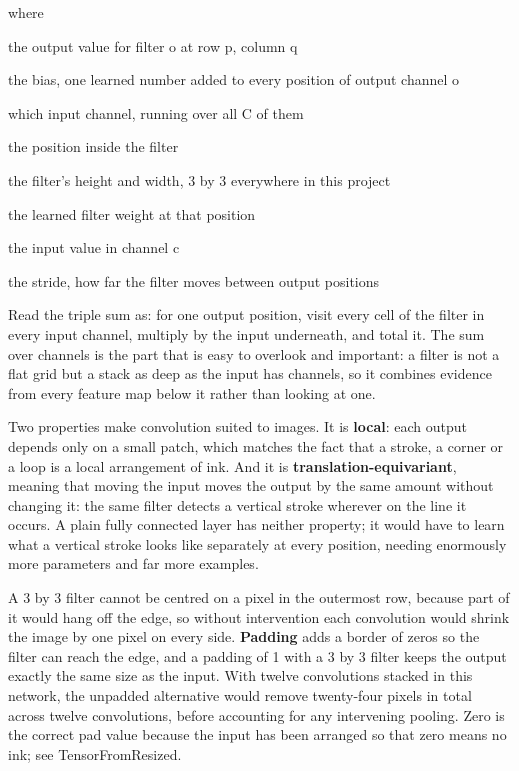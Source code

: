 \noindent where
\begin{description}[leftmargin=2.4em,style=nextline,font=\normalfont\ttfamily]\setlength\itemsep{1pt}
  \item[{$y[o,p,q]$}] \normalfont the output value for filter o at row p, column q
  \item[{$b[o]$}] \normalfont the bias, one learned number added to every position of output channel o
  \item[{$c$}] \normalfont which input channel, running over all C of them
  \item[{$u,\,v$}] \normalfont the position inside the filter
  \item[{$k_h,\,k_w$}] \normalfont the filter's height and width, 3 by 3 everywhere in this project
  \item[{$w[o,c,u,v]$}] \normalfont the learned filter weight at that position
  \item[{$x[c,\,y,\,x]$}] \normalfont the input value in channel c
  \item[{$s$}] \normalfont the stride, how far the filter moves between output positions
\end{description}
Read the triple sum as: for one output position, visit every cell of the filter in every input channel, multiply by the input underneath, and total it. The sum over channels is the part that is easy to overlook and important: a filter is not a flat grid but a stack as deep as the input has channels, so it combines evidence from every feature map below it rather than looking at one.


Two properties make convolution suited to images. It is \textbf{local}: each output depends only on a small patch, which matches the fact that a stroke, a corner or a loop is a local arrangement of ink. And it is \textbf{translation-equivariant}, meaning that moving the input moves the output by the same amount without changing it: the same filter detects a vertical stroke wherever on the line it occurs. A plain fully connected layer has neither property; it would have to learn what a vertical stroke looks like separately at every position, needing enormously more parameters and far more examples.


A 3 by 3 filter cannot be centred on a pixel in the outermost row, because part of it would hang off the edge, so without intervention each convolution would shrink the image by one pixel on every side. \textbf{Padding} adds a border of zeros so the filter can reach the edge, and a padding of 1 with a 3 by 3 filter keeps the output exactly the same size as the input. With twelve convolutions stacked in this network, the unpadded alternative would remove twenty-four pixels in total across twelve convolutions, before accounting for any intervening pooling. Zero is the correct pad value because the input has been arranged so that zero means no ink; see TensorFromResized.


